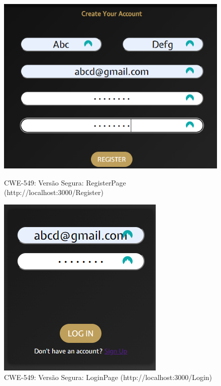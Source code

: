 \begin{figure}[H]
  \centering
  \begin{minipage}{0.45\textwidth}
    \centering
    \includegraphics[width=0.8\linewidth]{images/CWE549-safe-register.png}
    \caption{CWE-549: Versão Segura: RegisterPage (http://localhost:3000/Register)}
    \label{fig:cwe549-safe-register}
  \end{minipage}\hfill
  \begin{minipage}{0.45\textwidth}
    \centering
    \includegraphics[width=0.8\linewidth]{images/CWE549-safe-login.png}
    \caption{CWE-549: Versão Segura: LoginPage  (http://localhost:3000/Login)}
    \label{fig:cwe549-safe-login}
  \end{minipage}
\end{figure}

